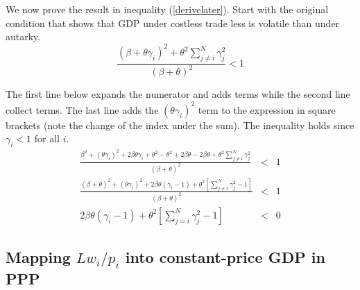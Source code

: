\documentclass[12pt]{article}
\begin{document}
We now prove the result in inequality (\ref{derivelater}). Start with the
original condition that shows that GDP under costless trade less is volatile
than under autarky. 
\begin{equation*}
\frac{\left( \beta +\theta \gamma _{i}\right) ^{2}+\theta ^{2}\sum_{j\neq
i}^{N}\gamma _{j}^{2}}{\left( \beta +\theta \right) ^{2}}<1
\end{equation*}

The first line below expands the numerator and adds terms while the second
line collect terms. The last line adds the $\left( \theta \gamma
_{i}\right)^{2}$ term to the expression in square brackets (note the change
of the index under the sum). The inequality holds since $\gamma _{i}<1$ for
all $i$. 
\begin{eqnarray*}
\frac{\beta ^{2}+\left( \theta \gamma _{i}\right) ^{2}+2\beta \theta
\gamma_{i}+\theta ^{2}-\theta ^{2}+2\beta \theta -2\beta \theta
+\theta^{2}\sum_{j\neq i}^{N}\gamma _{j}^{2}}{\left( \beta +\theta \right)
^{2}}&<&1 \\
\frac{\left( \beta +\theta \right) ^{2}+\left( \theta \gamma
_{i}\right)^{2}+2\beta \theta (\gamma _{i}-1)+\theta ^{2}\left[ \sum_{j\neq
i}^{N}\gamma _{j}^{2}-1\right] }{\left( \beta +\theta \right) ^{2}} &<&1 \\
2\beta \theta (\gamma _{i}-1)+\theta ^{2}\left[ \sum_{j=i}^{N}%
\gamma_{j}^{2}-1\right] &<&0
\end{eqnarray*}

\subsection{Mapping $Lw_{i}/p_{i}$ into constant-price GDP in PPP}
\end{document}
